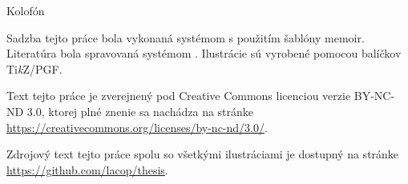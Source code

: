 \clearpage
\pagestyle{empty}
\null\vfil

\begin{adjustwidth}{2cm}{2cm}
\begin{center}
{\Large\textsf{Kolofón}}
\end{center}
\noindent Sadzba tejto práce bola vykonaná systémom \textsf{\XeLaTeX} s použitím šablóny \textsf{memoir}. Literatúra bola spravovaná systémom \textsf{\BibTeX}. Ilustrácie sú vyrobené pomocou balíčkov \textsf{Ti\textit{k}Z/PGF}.

\vspace{1cm}

\begin{center}
{\Large \ccbyncndeu}
\end{center}

\noindent Text tejto práce je zverejnený pod \textsf{Creative Commons} licenciou verzie \textsf{BY-NC-ND 3.0}, ktorej plné znenie sa nachádza na stránke \url{https://creativecommons.org/licenses/by-nc-nd/3.0/}.

\vspace{1cm}

\noindent Zdrojový text tejto práce spolu so všetkými ilustráciami je dostupný na stránke \url{https://github.com/lacop/thesis}.

\end{adjustwidth}

\vfil